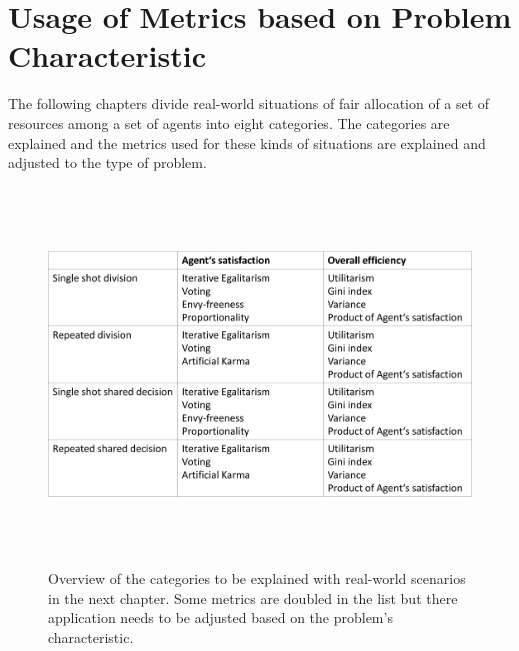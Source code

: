 \documentclass[german, a4paper, 11pt, oneside]{scrbook}
\begin{document}
\chapter{Usage of Metrics based on Problem Characteristic}
The following chapters divide real-world situations of fair allocation of a set of resources among a set of agents into eight categories. The categories are explained and the metrics used for these kinds of situations are explained and adjusted to the type of problem.
\begin{figure}[h]
\centering
\includegraphics[height=10cm]{Categories}
\caption{Overview of the categories to be explained with real-world scenarios in the next chapter. Some metrics are doubled in the list but there application needs to be adjusted based on the problem's characteristic.}
\end{figure}
\end{document}
